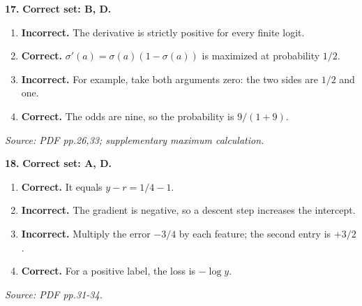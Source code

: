 \documentclass[11pt,a4paper]{article}
\begin{document}
\par\noindent\begin{minipage}{\linewidth}
\textbf{17.} \textbf{Correct set: B, D.}
\begin{enumerate}[label=(\Alph*),leftmargin=8mm,itemsep=2pt,topsep=2pt]
\item \textbf{Incorrect.} The derivative is strictly positive for every finite logit.
\item \textbf{Correct.} \(\sigma'(a)=\sigma(a)(1-\sigma(a))\) is maximized at probability \(1/2\).
\item \textbf{Incorrect.} For example, take both arguments zero: the two sides are \(1/2\) and one.
\item \textbf{Correct.} The odds are nine, so the probability is \(9/(1+9)\).
\end{enumerate}
{\footnotesize\textit{Source: PDF pp.26,33; supplementary maximum calculation.}}

\end{minipage}\par\vspace{3mm}
\par\noindent\begin{minipage}{\linewidth}
\textbf{18.} \textbf{Correct set: A, D.}
\begin{enumerate}[label=(\Alph*),leftmargin=8mm,itemsep=2pt,topsep=2pt]
\item \textbf{Correct.} It equals \(y-r=1/4-1\).
\item \textbf{Incorrect.} The gradient is negative, so a descent step increases the intercept.
\item \textbf{Incorrect.} Multiply the error \(-3/4\) by each feature; the second entry is \(+3/2\).
\item \textbf{Correct.} For a positive label, the loss is \(-\log y\).
\end{enumerate}
{\footnotesize\textit{Source: PDF pp.31-34.}}

\end{minipage}\par\vspace{3mm}
\end{document}
